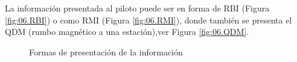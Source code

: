 

La informaci\'on presentada al piloto puede ser en forma de \ac{RBI} (Figura \ref{fig:06.RBI}) o como \ac{RMI} (Figura \ref{fig:06.RMI}), donde tambi\'en se presenta el QDM (rumbo magn\'etico a una estaci\'on),ver Figura  \ref{fig:06.QDM}. 

\begin{figure}[!h]
  \centering

  \caption{Formas de presentaci\'on de la informaci\'on \protect\cite{QDM-RBI-RMI}}
  \label{fig:06.RBI.RMI}
\end{figure}

